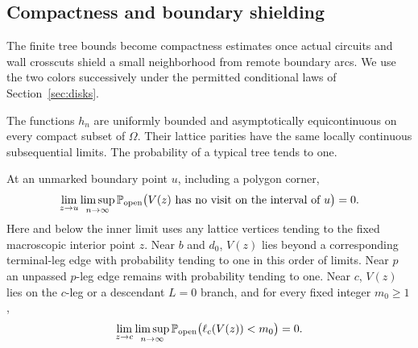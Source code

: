 \subsection{Compactness and boundary shielding}

The finite tree bounds become compactness estimates once actual
circuits and wall crosscuts shield a small neighborhood from remote
boundary arcs.  We use the two colors successively under the permitted
conditional laws of Section~\ref{sec:disks}.

\begin{lemma}
\label{lem:obs-compactness}
The functions $h_n$ are uniformly bounded and asymptotically
equicontinuous on every compact subset of $\Omega$.  Their lattice
parities have the same locally continuous subsequential limits.
The probability of a typical tree tends to one.

At an unmarked boundary point $u$, including a polygon corner,
\begin{equation}
 \lim_{z\to u}\limsup_{n\to\infty}
 \mathbb P_{\rm open}\bigl(V(z)\text{ has no visit on the interval of }u\bigr)=0.
 \label{obs:boundary-shield}
\end{equation}
Here and below the inner limit uses any lattice vertices tending to
the fixed macroscopic interior point $z$.  Near $b$ and $d_0$,
$V(z)$ lies beyond a corresponding terminal-leg edge with
probability tending to one in this order of limits.  Near $p$ an
unpassed $p$-leg edge remains with probability tending to one.
Near $c$, $V(z)$ lies on the $c$-leg or a descendant $L=0$ branch,
and for every fixed integer $m_0\ge1$,
\begin{equation}
 \lim_{z\to c}\limsup_{n\to\infty}
 \mathbb P_{\rm open}\bigl(\ell_c(V(z))<m_0\bigr)=0.
 \label{obs:c-many-edges}
\end{equation}
\end{lemma}

